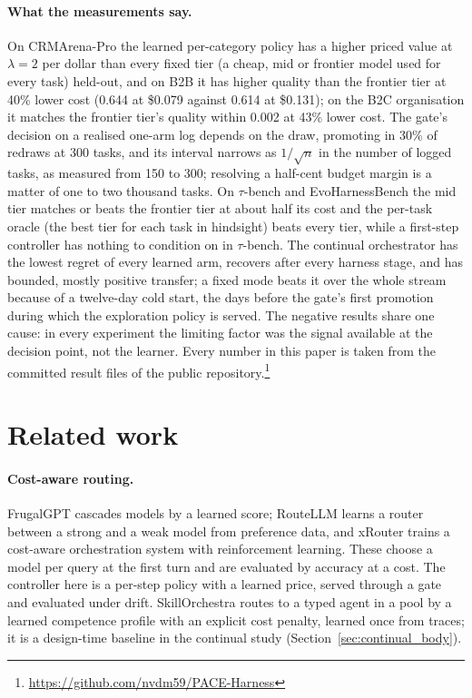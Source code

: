 \documentclass[10pt]{article}
\begin{document}
\paragraph{What the measurements say.} On CRMArena-Pro the learned per-category policy has a higher priced value at $\lambda=2$ per dollar than every fixed tier (a cheap, mid or frontier model used for every task) held-out, and on B2B it has higher quality than the frontier tier at 40\% lower cost (0.644 at \$0.079 against 0.614 at \$0.131); on the B2C organisation it matches the frontier tier's quality within 0.002 at 43\% lower cost. The gate's decision on a realised one-arm log depends on the draw, promoting in 30\% of redraws at 300 tasks, and its interval narrows as $1/\sqrt{n}$ in the number of logged tasks, as measured from 150 to 300; resolving a half-cent budget margin is a matter of one to two thousand tasks. On $\tau$-bench and EvoHarnessBench the mid tier matches or beats the frontier tier at about half its cost and the per-task oracle (the best tier for each task in hindsight) beats every tier, while a first-step controller has nothing to condition on in $\tau$-bench. The continual orchestrator has the lowest regret of every learned arm, recovers after every harness stage, and has bounded, mostly positive transfer; a fixed mode beats it over the whole stream because of a twelve-day cold start, the days before the gate's first promotion during which the exploration policy is served. The negative results share one cause: in every experiment the limiting factor was the signal available at the decision point, not the learner. Every number in this paper is taken from the committed result files of the public repository.\footnote{\url{https://github.com/nvdm59/PACE-Harness}}

\section{Related work}
\label{sec:related}

\paragraph{Cost-aware routing.} FrugalGPT \citep{frugalgpt2023} cascades models by a learned score; RouteLLM \citep{routellm2024} learns a router between a strong and a weak model from preference data, and xRouter \citep{xrouter2025} trains a cost-aware orchestration system with reinforcement learning. These choose a model per query at the first turn and are evaluated by accuracy at a cost. The controller here is a per-step policy with a learned price, served through a gate and evaluated under drift. SkillOrchestra \citep{skillorchestra2026} routes to a typed agent in a pool by a learned competence profile with an explicit cost penalty, learned once from traces; it is a design-time baseline in the continual study (Section~\ref{sec:continual_body}).
\end{document}
